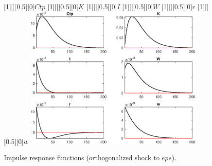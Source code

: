 \begin{figure}[H]
[1][][0.5][0]{$Ctp$}
[1][][0.5][0]{$K$}
[1][][0.5][0]{$I$}
[1][][0.5][0]{$W$}
[1][][0.5][0]{$r$}
[1][][0.5][0]{$w$}
\centering 
\includegraphics[width=0.80\textwidth]{DyTruncation/graphs/DyTruncation_IRF_eps3}
\caption{Impulse response functions (orthogonalized shock to $eps$).}\label{Fig:IRF:eps:3}
\end{figure}
 
 
